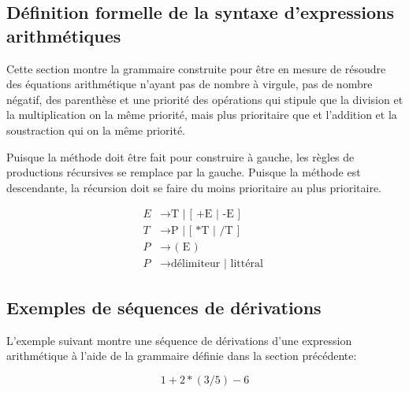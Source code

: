 \subsection{Définition formelle de la syntaxe d’expressions arithmétiques}

Cette section montre la grammaire construite pour être en mesure de résoudre
des équations arithmétique n'ayant pas de nombre à virgule, pas de nombre
négatif, des parenthèse et une priorité des opérations qui stipule que la
division et la multiplication on la même priorité, mais plus prioritaire que
et l'addition et la soustraction qui on la même priorité.

Puisque la méthode doit être fait pour construire à gauche, les règles de
productions récursives se remplace par la gauche. Puisque la méthode est
descendante, la récursion doit se faire du moins prioritaire au plus
prioritaire.

\begin{align}
E &\rightarrow \textrm{T | [ +E | -E ]} \\
T &\rightarrow \textrm{P | [ *T | /T ]} \\
P &\rightarrow \textrm{ ( E ) } \\
P &\rightarrow \textrm{délimiteur | littéral }
\end{align}

\subsection{Exemples de séquences de dérivations}
L'exemple suivant montre une séquence de dérivations d'une expression arithmétique à l'aide de la grammaire définie dans la section précédente:

\begin{equation}
  1+2*(3/5)-6
\end{equation}

